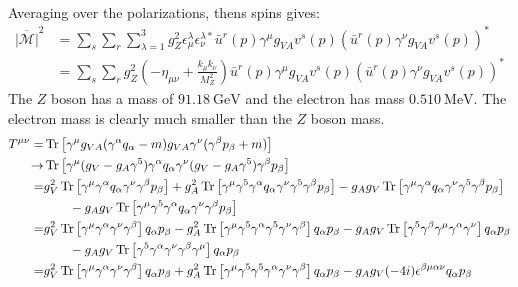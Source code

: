 \documentclass[12pt,a4]{article}
\begin{document}
\begin{enumerate}
\begin{enumerate}
\begin{align*}
        \end{align*}
        Averaging over the polarizations, thens spins gives:
        \begin{align*}
          \overline{|\mathcal{M}|}^2 
                                   &= \sum_{s}\sum_{r}\sum_{\lambda = 1}^{3} g_Z^2 \epsilon_\mu^\lambda \epsilon_\nu^{\lambda *} \bar{u}^r(p) \gamma^\mu g_{V A} v^s(p) ( \bar{u}^r(p) \gamma^\nu g_{V A} v^s(p))^*\\
                                   &= \sum_{s}\sum_{r}g_Z^2 \left(- \eta_{\mu \nu} + \frac{k_\mu k_\nu}{M_Z^2}\right) \bar{u}^r(p) \gamma^\mu g_{V A} v^s(p) ( \bar{u}^r(p) \gamma^\nu g_{V A} v^s(p))^*
        \end{align*}
        The $Z$ boson has a mass of $\SI{91.18}{\giga \eV}$ and the electron has mass $\SI{0.510}{\mega \eV}$. 
        The electron mass is clearly much smaller than the $Z$ boson mass.
        \begin{align*}
          T^{\mu\nu}  =& \Tr\left[\gamma^\mu g_{VA} (\gamma^\alpha q_\alpha - m) g_{VA} \gamma^\nu (\gamma^\beta p_\beta + m) \right]\\
                   \to & \Tr\left[\gamma^\mu (g_V - g_A \gamma^5) \gamma^\alpha q_\alpha \gamma^\nu (g_V - g_A \gamma^5) \gamma^\beta p_\beta \right]\\
                      =& g_V^2 \Tr\left[\gamma^\mu  \gamma^\alpha q_\alpha \gamma^\nu \gamma^\beta p_\beta \right] + g_A^2 \Tr\left[\gamma^\mu \gamma^5 \gamma^\alpha q_\alpha \gamma^\nu \gamma^5 \gamma^\beta p_\beta \right] -  g_A g_V\Tr\left[\gamma^\mu \gamma^\alpha q_\alpha \gamma^\nu  \gamma^5 \gamma^\beta p_\beta \right]\\
                       & \qquad -  g_A g_V\Tr\left[\gamma^\mu \gamma^5 \gamma^\alpha q_\alpha \gamma^\nu  \gamma^\beta p_\beta \right]\\
                      =& g_V^2 \Tr\left[\gamma^\mu  \gamma^\alpha \gamma^\nu \gamma^\beta \right]q_\alpha p_\beta - g_A^2 \Tr\left[\gamma^\mu \gamma^5 \gamma^\alpha \gamma^5\gamma^\nu \gamma^\beta  \right]q_\alpha  p_\beta-  g_A g_V\Tr\left[\gamma^5 \gamma^\beta \gamma^\mu \gamma^\alpha \gamma^\nu   \right]q_\alpha p_\beta\\
                       & \qquad -  g_A g_V\Tr\left[\gamma^5 \gamma^\alpha \gamma^\nu  \gamma^\beta \gamma^\mu \right]q_\alpha p_\beta \\
                      =& g_V^2 \Tr\left[\gamma^\mu  \gamma^\alpha \gamma^\nu \gamma^\beta \right]q_\alpha p_\beta + g_A^2 \Tr\left[\gamma^\mu \gamma^5 \gamma^5 \gamma^\alpha \gamma^\nu  \gamma^\beta  \right]q_\alpha  p_\beta-  g_A g_V(-4 i)\epsilon^{\beta \mu \alpha \nu} q_\alpha p_\beta\\

\end{align*}
\end{enumerate}
\end{enumerate}
\end{document}

